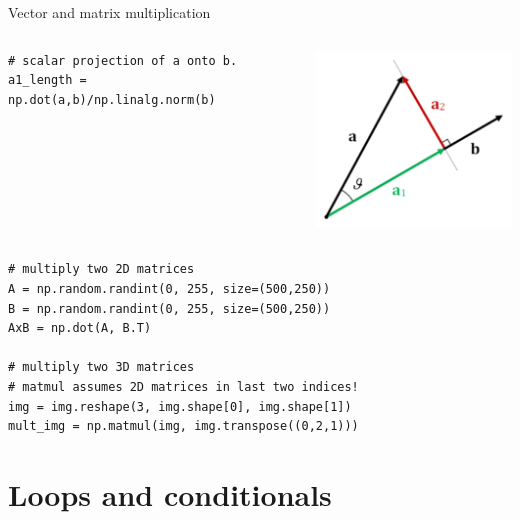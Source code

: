 \documentclass[compress%
,aspectratio=169%
]{beamer}
\begin{document}
\begin{frame}[fragile]{Vector and matrix multiplication}
    
\begin{columns}
\begin{lstlisting}
# scalar projection of a onto b.
a1_length = np.dot(a,b)/np.linalg.norm(b)
\end{lstlisting}
\includegraphics[width=0.8\linewidth]{img/scalar_projection.png}
\end{columns}

\begin{lstlisting}
# multiply two 2D matrices
A = np.random.randint(0, 255, size=(500,250)) 
B = np.random.randint(0, 255, size=(500,250))
AxB = np.dot(A, B.T)

# multiply two 3D matrices
# matmul assumes 2D matrices in last two indices!
img = img.reshape(3, img.shape[0], img.shape[1])
mult_img = np.matmul(img, img.transpose((0,2,1)))
\end{lstlisting}
\end{frame}

\section{Loops and conditionals}
\end{document}
